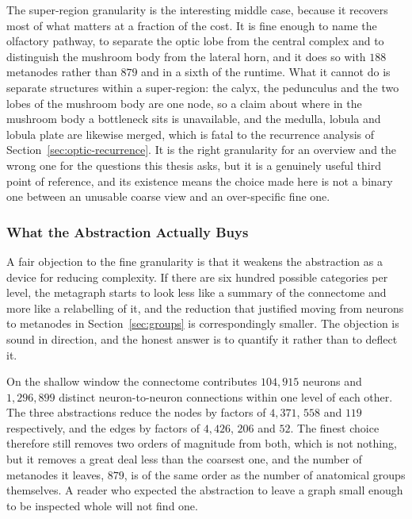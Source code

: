 \documentclass[12pt,a4paper,oneside]{article}
\theoremstyle{definition}
\theoremstyle{plain}
\begin{document}
The super-region granularity is the interesting middle case, because it
recovers most of what matters at a fraction of the cost. It is fine enough to
name the olfactory pathway, to separate the optic lobe from the central
complex and to distinguish the mushroom body from the lateral horn, and it
does so with $188$ metanodes rather than $879$ and in a sixth of the runtime.
What it cannot do is separate structures within a super-region: the calyx,
the pedunculus and the two lobes of the mushroom body are one node, so a
claim about where in the mushroom body a bottleneck sits is unavailable, and
the medulla, lobula and lobula plate are likewise merged, which is fatal to
the recurrence analysis of Section~\ref{sec:optic-recurrence}. It is the
right granularity for an overview and the wrong one for the questions this
thesis asks, but it is a genuinely useful third point of reference, and its
existence means the choice made here is not a binary one between an
unusable coarse view and an over-specific fine one.

\subsubsection{What the Abstraction Actually Buys}
\label{sec:abstraction-cost}

A fair objection to the fine granularity is that it weakens the abstraction
as a device for reducing complexity. If there are six hundred possible
categories per level, the metagraph starts to look less like a summary of the
connectome and more like a relabelling of it, and the reduction that
justified moving from neurons to metanodes in Section~\ref{sec:groups} is
correspondingly smaller. The objection is sound in direction, and the honest
answer is to quantify it rather than to deflect it.

On the shallow window the connectome contributes $104{,}915$ neurons and
$1{,}296{,}899$ distinct neuron-to-neuron connections within one level of
each other. The three abstractions reduce the nodes by factors of $4{,}371$,
$558$ and $119$ respectively, and the edges by factors of $4{,}426$, $206$
and $52$. The finest choice therefore still removes two orders of magnitude
from both, which is not nothing, but it removes a great deal less than the
coarsest one, and the number of metanodes it leaves, $879$, is of the same
order as the number of anatomical groups themselves. A reader who expected
the abstraction to leave a graph small enough to be inspected whole will not
find one.
\end{document}
